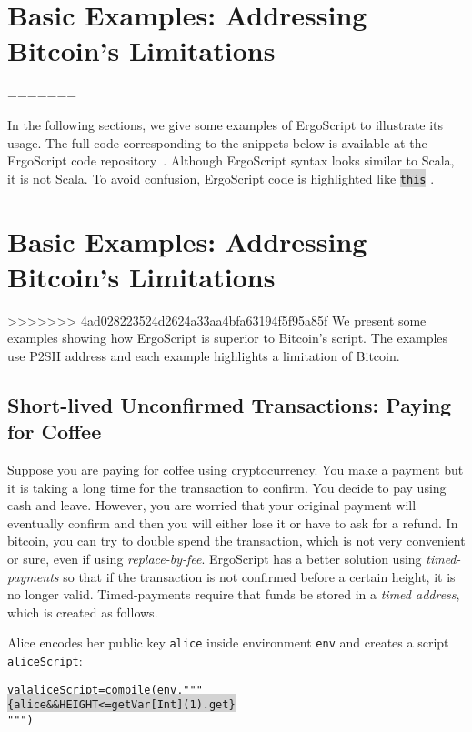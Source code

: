 \documentclass[11pt]{article}
\newcommand\Hi[2][lightgray]{%
	\hspace*{-\fboxsep}%
	\colorbox{#1}{#2}%
	\hspace*{-\fboxsep}%
}
\newcommand{\langname}{ErgoScript\xspace}
\begin{document}
\section{Basic Examples: Addressing Bitcoin's Limitations}

=======

In the following sections, we give some examples of \langname to illustrate its usage. The full code corresponding to the snippets below is available at the \langname code repository~\cite{langrepo}. 
Although \langname syntax looks similar to Scala, it is not Scala. To avoid confusion, \langname code is highlighted like \Hi{\texttt{this}}. 
\section{Basic Examples: Addressing Bitcoin's Limitations}

>>>>>>> 4ad028223524d2624a33aa4bfa63194f5f95a85f
We present some examples showing how \langname is superior to Bitcoin's script. The examples use P2SH address and each example highlights a limitation of Bitcoin. 

\subsection{Short-lived Unconfirmed Transactions: Paying for Coffee}

Suppose you are paying for coffee using cryptocurrency. You make a payment but it is taking a long time for the transaction to confirm. You decide to pay using cash and leave. However, you are worried that your original payment will eventually confirm and then you will either lose it or have to ask for a refund. In bitcoin, you can try to double spend the transaction, which is not very convenient or sure, even if using {\em replace-by-fee}. \langname has a better solution using {\em timed-payments} so that if the transaction is not confirmed before a certain height, it is no longer valid. Timed-payments require that funds be stored in a {\em timed address}, which is created as follows. 

Alice encodes her public key \texttt{alice} inside environment \texttt{env} and creates a script \texttt{aliceScript}:
\begin{alltt}
	val aliceScript = compile(env, """ \Hi{\{alice && HEIGHT <= getVar[Int](1).get\}}""")
\end{alltt}
\end{document}
